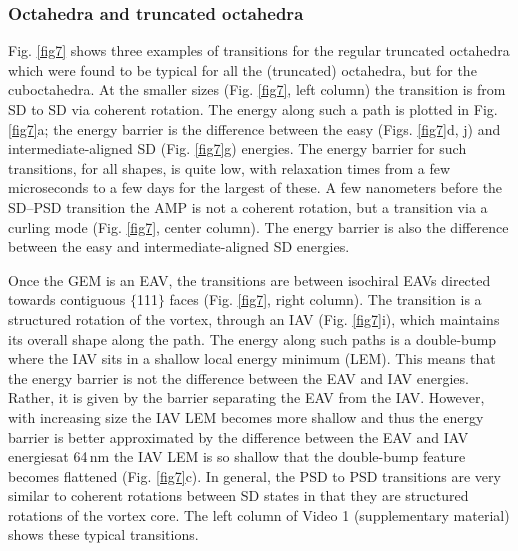 \documentclass[review,authoryear]{elsarticle}
\newcommand{\nm}{\,\text{nm}}
\begin{document}
\subsubsection{Octahedra and truncated octahedra}
Fig. \ref{fig7} shows three examples of transitions for the regular truncated octahedra which were found to be typical for all the (truncated) octahedra, but for the cuboctahedra. At the smaller sizes (Fig. \ref{fig7}, left column) the transition is from SD to SD via coherent rotation. The energy along such a path is plotted in Fig. \ref{fig7}a; the energy barrier is the difference between the easy (Figs. \ref{fig7}d, j) and intermediate-aligned SD (Fig. \ref{fig7}g) energies. The energy barrier for such transitions, for all shapes, is quite low, with relaxation times from a few microseconds to a few days for the largest of these. A few nanometers before the SD--PSD transition the AMP is not a coherent rotation, but a transition via a curling mode (Fig. \ref{fig7}, center column). The energy barrier is also the difference between the easy and intermediate-aligned SD energies.\par

Once the GEM is an EAV, the transitions are between isochiral EAVs directed towards contiguous $\{$111$\}$ faces (Fig. \ref{fig7}, right column). The transition is a structured rotation of the vortex, through an IAV (Fig. \ref{fig7}i), which maintains its overall shape along the path. The energy along such paths is a double-bump where the IAV sits in a shallow local energy minimum (LEM). This means that the energy barrier is not the difference between the EAV and IAV energies. Rather, it is given by the barrier separating the EAV from the IAV. However, with increasing size the IAV LEM becomes more shallow and thus the energy barrier is better approximated by the difference between the EAV and IAV energies{\textemdash}at 64$\nm$ the IAV LEM is so shallow that the double-bump feature becomes flattened (Fig. \ref{fig7}c). In general, the PSD to PSD transitions are very similar to coherent rotations between SD states in that they are structured rotations of the vortex core. The left column of Video 1 (supplementary material) shows these typical transitions.\par
\end{document}
